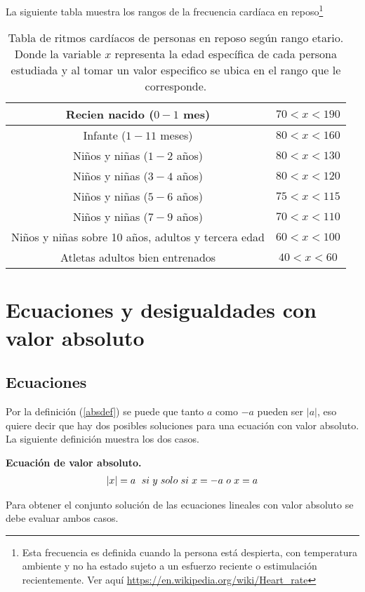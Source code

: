 \begin{myexample}
La siguiente tabla muestra los rangos de la frecuencia cardíaca en reposo\footnote{Esta frecuencia es definida cuando la persona está despierta, con temperatura ambiente y no ha estado sujeto a un esfuerzo reciente o estimulación recientemente. Ver aquí \url{https://en.wikipedia.org/wiki/Heart_rate}}
\end{myexample}

\begin{table}[h!]
\begin{center}
\begin{tabular}{|c|c|}
\hline
Recien nacido ($0-1$ mes)& $70<x<190$\\
\hline
Infante ($1-11$ meses)& $80<x<160$\\
\hline
Niños y niñas ($1-2$ años)& $80<x<130$\\
\hline
Niños y niñas ($3-4$ años)& $80<x<120$\\
\hline
Niños y niñas ($5-6$ años)& $75<x<115$\\
\hline
Niños y niñas ($7-9$ años)& $70<x<110$\\
\hline
Niños y niñas sobre 10 años, adultos y tercera edad & $60<x<100$\\
\hline
Atletas adultos bien entrenados & $40<x<60$\\
\hline
\end{tabular}
\caption[Tabla de ritmos cardíacos de personas en reposo según rango etario]{Tabla de ritmos cardíacos de personas en reposo según rango etario. Donde la variable $x$ representa la edad específica de cada persona estudiada y al tomar un valor especifico se ubica en el rango que le corresponde.}
\end{center}
\end{table}

\section{Ecuaciones y desigualdades con valor absoluto}
\subsection{Ecuaciones}
Por la definición (\ref{absdef}) se puede que tanto $a$ como $-a$ pueden ser $|a|$, eso quiere decir que hay dos posibles soluciones para una ecuación con valor absoluto. La siguiente definición muestra los dos casos.
\begin{mydef}
\textbf{Ecuación de valor absoluto.}
\begin{eqnarray*}
|x|=a\hspace{6px} si\hspace{3px}y\hspace{3px}solo\hspace{3px}si\hspace{3px}x=-a\hspace{3px}o\hspace{3px}x=a
\end{eqnarray*}
\end{mydef}
Para obtener el conjunto solución de las ecuaciones lineales con valor absoluto se debe evaluar ambos casos.


